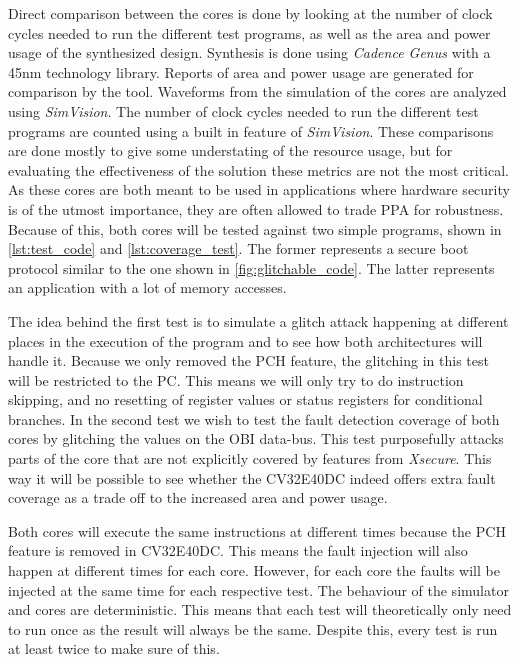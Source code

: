 Direct comparison between the cores is done by looking at the number of clock cycles needed to run the different test programs, as well as the area and power usage of the synthesized design. Synthesis is done using \textit{Cadence Genus} with a 45nm technology library. Reports of area and power usage are generated for comparison by the tool. Waveforms from the simulation of the cores are analyzed using \textit{SimVision}. The number of clock cycles needed to run the different test programs are counted using a built in feature of \textit{SimVision}. These comparisons are done mostly to give some understating of the resource usage, but for evaluating the effectiveness of the solution these metrics are not the most critical. As these cores are both meant to be used in applications where hardware security is of the utmost importance, they are often allowed to trade PPA for robustness. Because of this, both cores will be tested against two simple programs, shown in \autoref{lst:test_code} and \autoref{lst:coverage_test}. The former represents a secure boot protocol similar to the one shown in \autoref{fig:glitchable_code}. The latter represents an application with a lot of memory accesses. 

The idea behind the first test is to simulate a glitch attack happening at different places in the execution of the program and to see how both architectures will handle it. Because we only removed the PCH feature, the glitching in this test will be restricted to the PC. This means we will only try to do instruction skipping, and no resetting of register values or status registers for conditional branches. In the second test we wish to test the fault detection coverage of both cores by glitching the values on the OBI data-bus. This test purposefully attacks parts of the core that are not explicitly covered by features from \textit{Xsecure}. This way it will be possible to see whether the CV32E40DC indeed offers extra fault coverage as a trade off to the increased area and power usage. 

Both cores will execute the same instructions at different times because the PCH feature is removed in CV32E40DC. This means the fault injection will also happen at different times for each core. However, for each core the faults will be injected at the same time for each respective test. The behaviour of the simulator and cores are deterministic. This means that each test will theoretically only need to run once as the result will always be the same. Despite this, every test is run at least twice to make sure of this.


